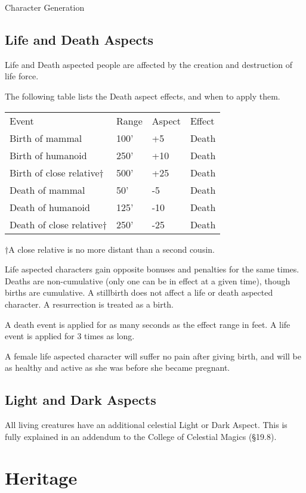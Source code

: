 \begin{Chapter}{Character Generation}
\subsection{Life and Death Aspects}

Life and Death aspected people are affected by the creation and
destruction of life force.

The following table lists the Death aspect effects, and when to apply
them.

\begin{tabularx}{\columnwidth}{Xlll}
Event				& Range		& Aspect	& Effect \\
Birth of mammal  		& 100’		& +5		& Death \\
Birth of humanoid  		& 250’		& +10		& Death \\
Birth of close relative†	& 500’		& +25		& Death \\
Death of mammal  		& 50’		& -5		& Death \\
Death of humanoid  		& 125’		& -10		& Death \\
Death of close relative†	& 250’		& -25		& Death \\
\end{tabularx}

†A close relative is no more distant than a second cousin.

Life aspected characters gain opposite bonuses and penalties for the
same times.  Deaths are non-cumulative (only one can be in effect at a
given time), though births are cumulative.  A stillbirth does not
affect a life or death aspected character. A resurrection is treated
as a birth.

A death event is applied for as many seconds as the effect range in
feet.  A life event is applied for 3 times as long.

A female life aspected character will suffer no pain after giving
birth, and will be as healthy and active as she was before she became
pregnant.

\subsection{Light and Dark Aspects}

All living creatures have an additional celestial Light or Dark
Aspect.  This is fully explained in an addendum to the College of
Celestial Magics (§19.8).

\section{Heritage}


\end{Chapter}
